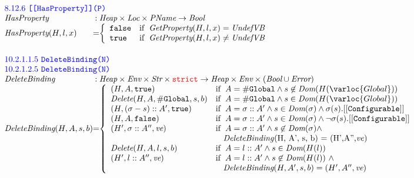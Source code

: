 \[
\begin{array}{l@{}c@{}l}

\multicolumn{3}{l}{\mbox{\inblue 8.12.6 {\tt [[HasProperty]](P)}}}\\
\hf{HasProperty} & :& \Heap \times \Loc \times \Prop \rightarrow \Bool \\
\hf{HasProperty}(H,l,x) &=&
\left\{\begin{array}{ll}
\false & \ifc{\hf{GetProperty}(H,l,x) = \UndefVB} \\
\true & \ifc{\hf{GetProperty}(H,l,x) \not= \UndefVB} \\
\end{array}\right.
\\[2em]

\multicolumn{3}{l}{\mbox{\inblue 10.2.1.1.5 {\tt DeleteBinding(N)}}}\\
\multicolumn{3}{l}{\mbox{\inblue 10.2.1.2.5 {\tt DeleteBinding(N)}}}\\
\hf{DeleteBinding} & :& \Heap \times \Env \times \Str \times \strict \rightarrow
\Heap \times \Env \times (\Bool\cup\Error) \\
\hf{DeleteBinding}(H,A,s,b) &=&
\left\{\begin{array}{ll}
(H,A,\true) &\ifc{A = \lg \wedge
 s\not\in\hf{Dom}(H(\varloc{Global}))}\\
\hf{Delete}(H,A,\lg,s,b) &\ifc{A = \lg \wedge
 s\in\hf{Dom}(H(\varloc{Global}))}\\
(H, (\er - s)::A', \true) &\ifc{A = \er::A'\wedge s\in\hf{Dom}(\er) \wedge \er(s).[[{\tt Configurable}]]} \\
(H, A, \false) &\ifc{A = \er::A'\wedge s\in\hf{Dom}(\er) \wedge \neg\er(s).[[{\tt Configurable}]]} \\
(H',\er::A'',\emph{ve})
&\ifc{A = \er::A'\wedge s\not\in\hf{Dom}(\er) \wedge}\\
&\mbox{\phantom{if\ }\hf{DeleteBinding}(H, A', s, b) = (H',A'',\emph{ve})}\\
\hf{Delete}(H,A,l,s,b)
&\ifc{A = l::A' \wedge s\in\hf{Dom}(H(l))} \\
(H',l::A'',\emph{ve})
&\ifc{A = l::A' \wedge s\not\in\hf{Dom}(H(l))\ \wedge}\\
&\mbox{\phantom{if\ }$\hf{DeleteBinding}(H, A', s, b) = (H',A'',\emph{ve})$} \\
\end{array}\right.
\\\\


\end{array}\]
